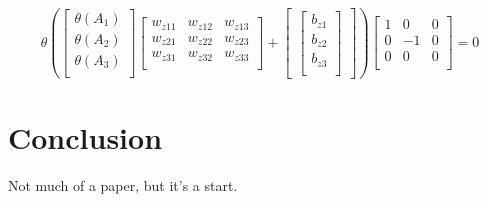 \documentclass{article}
\begin{document}
\[
\theta(   
\begin{bmatrix}   
    \theta(A_1)\\
    \theta(A_2)\\
    \theta(A_3)\\
    \end{bmatrix}
\begin{bmatrix}
    w_{z11} & w_{z12} & w_{z13}\\
    w_{z21} & w_{z22} & w_{z23}\\
    w_{z31} & w_{z32} & w_{z33}\\
\end{bmatrix}
    +
\begin{bmatrix}
    \begin{bmatrix}
        b_{z1}\\
        b_{z2}\\
        b_{z3}\\
    \end{bmatrix}
\end{bmatrix}
)
%
\begin{bmatrix}   
    1 & 0 & 0 \\
    0 & -1 & 0 \\
    0 & 0 & 0 \\
    \end{bmatrix} 
%
    = 0
\]



\section{Conclusion}
Not much of a paper, but it's a start.
\end{document}
